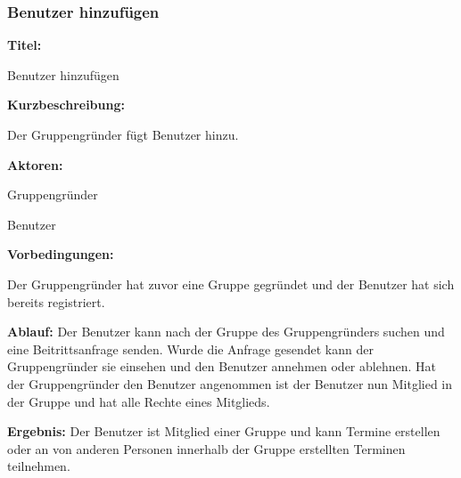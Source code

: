 \documentclass{scrartcl}
\begin{document}
	\subsubsection{Benutzer hinzufügen}
	\begin{description}
		\item \textbf{Titel:}
		\begin{description}
			\item Benutzer hinzufügen
		\end{description}
		\item \textbf{Kurzbeschreibung:}
		\begin{description}
			\item Der Gruppengründer fügt Benutzer hinzu.
		\end{description}
		\item \textbf{Aktoren:}
		\begin{description}
			\item Gruppengründer
			\item Benutzer
		\end{description}
		\item \textbf{Vorbedingungen:}
		\begin{description}
			\item Der Gruppengründer hat zuvor eine Gruppe gegründet und der Benutzer hat sich bereits registriert.
		\end{description}
		\item \textbf{Ablauf:} \newline Der Benutzer kann nach der Gruppe des Gruppengründers suchen und eine Beitrittsanfrage senden. Wurde die Anfrage gesendet kann der Gruppengründer sie einsehen und den Benutzer annehmen oder ablehnen. Hat der Gruppengründer den Benutzer angenommen ist der Benutzer nun Mitglied in der Gruppe und hat alle Rechte eines Mitglieds.
		\item \textbf{Ergebnis:} \newline Der Benutzer ist Mitglied einer Gruppe und kann Termine erstellen oder an von anderen Personen innerhalb der Gruppe erstellten Terminen teilnehmen.
	\end{description}
	
	\newpage
	
\end{document}
